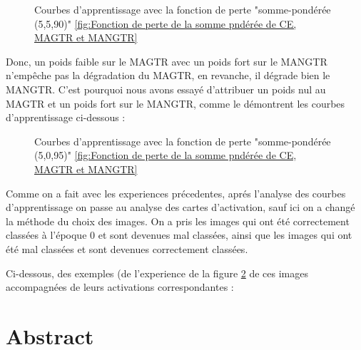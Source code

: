 \documentclass{report}
\begin{document}
{    \begin{figure}[htbp] 
	\centering
	\caption{Courbes d'apprentissage avec la fonction de perte "somme-pondérée (5,5,90)" \ref{fig:Fonction de perte de la somme pndérée de CE, MAGTR et MANGTR}}
	\label{fig:Courbes d'apprentissage de l'expérience "somme-pondérée mangtr5595"}
    \end{figure}
\newpage
\hspace{1.6cm}Donc, un poids faible sur le MAGTR avec un poids fort sur le MANGTR n'empêche pas la dégradation du MAGTR, en revanche, il dégrade bien le MANGTR. C'est pourquoi nous avons essayé d'attribuer un poids nul au MAGTR et un poids fort sur le MANGTR, comme le démontrent les courbes d'apprentissage ci-dessous :
    \begin{figure}[htbp] 
	\centering
	\caption{Courbes d'apprentissage avec la fonction de perte "somme-pondérée (5,0,95)" \ref{fig:Fonction de perte de la somme pndérée de CE, MAGTR et MANGTR}}
	\label{fig:Courbes d'apprentissage de l'expérience "somme-pondérée mangtr5095"}
    \end{figure}



\hspace{1.6cm}Comme on a fait avec les experiences précedentes, aprés l'analyse des courbes d'apprentissage on passe au analyse des cartes d'activation, sauf ici on a changé la méthode du choix des images. On a pris les images qui ont été correctement classées à l'époque 0 et sont devenues mal classées, ainsi que les images qui ont été mal classées et sont devenues correctement classées. 

\hspace{1.6cm}Ci-dessous, des exemples (de l'experience de la figure \ref{fig:Courbes d'apprentissage de l'expérience "somme-pondérée mangtr5095"} de ces images accompagnées de leurs activations correspondantes :









\chapter*{Abstract}
}
\end{document}

